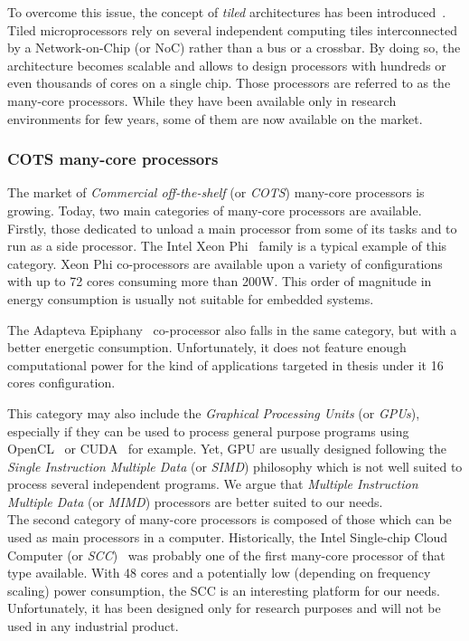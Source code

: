\documentclass[main.tex]{subfiles}
\begin{document}
To overcome this issue, the concept of \emph{tiled} architectures has been introduced~\cite{Taylor2007}. Tiled microprocessors rely on several independent computing tiles interconnected by a Network-on-Chip (or NoC) rather than a bus or a crossbar. By doing so, the architecture becomes scalable and allows to design processors with hundreds or even thousands of cores on a single chip. Those processors are referred to as the many-core processors. While they have been available only in research environments for few years, some of them are now available on the market.



\subsubsection{COTS many-core processors}
The market of \emph{Commercial off-the-shelf} (or \emph{COTS}) many-core processors is growing. Today, two main categories of many-core processors are available. Firstly, those dedicated to unload a main processor from some of its tasks and to run as a side processor. The Intel Xeon Phi~\cite{XeonPhi} family is a typical example of this category. Xeon Phi co-processors are available upon a variety of configurations with up to 72 cores consuming more than 200W. This order of magnitude in energy consumption is usually not suitable for embedded systems. 

The Adapteva Epiphany~\cite{Epiphany} co-processor also falls in the same category, but with a better energetic consumption. Unfortunately, it does not feature enough computational power for the kind of applications targeted in thesis under it 16 cores configuration. 

This category may also include the \emph{Graphical Processing Units} (or \emph{GPUs}), especially if they can be used to process general purpose programs using OpenCL~\cite{OpenCL} or CUDA~\cite{CUDA} for example. Yet, GPU are usually designed following the \emph{Single Instruction Multiple Data} (or \emph{SIMD}) philosophy which is not well suited to process several independent programs. We argue that \emph{Multiple Instruction Multiple Data} (or \emph{MIMD}) processors are better suited to our needs. \\


The second category of many-core processors is composed of those which can be used as main processors in a computer. Historically, the Intel Single-chip Cloud Computer (or \emph{SCC})~\cite{intel_scc} was probably one of the first many-core processor of that type available. With 48 cores and a potentially low (depending on frequency scaling) power consumption, the SCC is an interesting platform for our needs. Unfortunately, it has been designed only for research purposes and will not be used in any industrial product.
\end{document}
